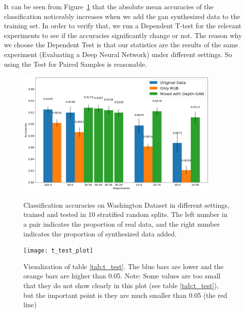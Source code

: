 It can be seen from Figure~\ref{fig:eitel_accuracies} that the absolute mean accuracies of
the classification noticeably increases when we add the \acrshort{gan} synthesized data to
the training set. In order to verify that, we run a Dependent T-test for the relevant
experiments to see if the accuracies significantly change or not. The reason why we choose
the Dependent Test is that our statistics are the results of the same experiment
(Evaluating a Deep Neural Network) under different settings. So using the Test for Paired
Samples is reasonable.

\begin{figure}[h!]
	\caption{Classification accuracies on Washington Dataset in different settings,
		trained and tested in 10 stratified random splits. The left number in a pair indicates
		the proportion of real data, and the right number indicates the proportion of synthesized
	data added.}
	\centering
	\includegraphics[width=0.9\textwidth]{img/eitel_accuracies}
	\label{fig:eitel_accuracies}
\end{figure}

\begin{figure}[h!]
	\centering
	\texttt{[image: t\_test\_plot]}
	\caption{Visualization of table \ref{tab:t_test}. The blue bars are lower
	and the orange bars are higher than 0.05. 
	Note: Some values are too small that they do not show clearly in this plot (see table
	\ref{tab:t_test}), but the important point is they are much smaller than 0.05 (the red
line)}
\label{fig:t_test_plot}
\end{figure}


